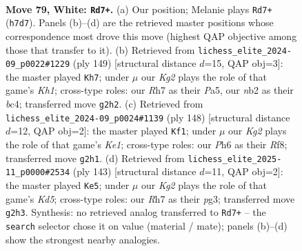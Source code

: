 \documentclass[11pt]{article}
\begin{document}
\clearpage

\begin{figure}[p]\centering
\begin{subfigure}{0.46\textwidth}\centering
\resizebox{\linewidth}{!}{%
\newchessgame
\chessboard[
  setfen={8/7R/6pP/3k1p2/5P2/8/pn4K1/8 w - - 0 79},
  showmover=false,
  pgfstyle=straightmove, color=movearrow, markmove={h7-d7}
]}
\caption{}
\end{subfigure}\hfill
\begin{subfigure}{0.46\textwidth}\centering
\resizebox{\linewidth}{!}{%
\newchessgame
\chessboard[
  setfen={7k/6p1/8/p4K1p/P1B4P/6P1/8/8 b - - 0 75},
  showmover=false,
  pgfstyle=straightmove, color=movearrow, markmove={h8-h7}
]}
\caption{}
\end{subfigure}
\\[4pt]
\begin{subfigure}{0.46\textwidth}\centering
\resizebox{\linewidth}{!}{%
\newchessgame
\chessboard[
  setfen={5R2/8/8/4p1k1/3p4/5P2/r7/4K3 w - - 16 75},
  showmover=false,
  pgfstyle=straightmove, color=movearrow, markmove={e1-f1}
]}
\caption{}
\end{subfigure}\hfill
\begin{subfigure}{0.46\textwidth}\centering
\resizebox{\linewidth}{!}{%
\newchessgame
\chessboard[
  setfen={8/8/8/8/pP1k2p1/P2p2P1/8/4K3 b - - 2 72},
  showmover=false,
  pgfstyle=straightmove, color=movearrow, markmove={d4-e5}
]}
\caption{}
\end{subfigure}
\caption{\textbf{Move 79, White: \texttt{Rd7+}.} (a) Our position; Melanie plays \texttt{Rd7+} (\texttt{h7d7}). Panels (b)--(d) are the retrieved master positions whose correspondence most drove this move (highest QAP objective among those that transfer to it). (b) Retrieved from \texttt{lichess\_elite\_2024-09\_p0022\#1229} (ply 149) [structural distance $d$=15, QAP obj=3]: the master played \texttt{Kh7}; under $\mu$ our \emph{Kg2} plays the role of that game's \emph{Kh1}; cross-type roles: our \emph{R}h7 as their \emph{P}a5, our \emph{n}b2 as their \emph{b}c4; transferred move \texttt{g2h2}. (c) Retrieved from \texttt{lichess\_elite\_2024-09\_p0024\#1139} (ply 148) [structural distance $d$=12, QAP obj=2]: the master played \texttt{Kf1}; under $\mu$ our \emph{Kg2} plays the role of that game's \emph{Ke1}; cross-type roles: our \emph{P}h6 as their \emph{R}f8; transferred move \texttt{g2h1}. (d) Retrieved from \texttt{lichess\_elite\_2025-11\_p0000\#2534} (ply 143) [structural distance $d$=11, QAP obj=2]: the master played \texttt{Ke5}; under $\mu$ our \emph{Kg2} plays the role of that game's \emph{Kd5}; cross-type roles: our \emph{R}h7 as their \emph{p}g3; transferred move \texttt{g2h3}. Synthesis: no retrieved analog transferred to \texttt{Rd7+} -- the \texttt{search} selector chose it on value (material / mate); panels (b)--(d) show the strongest nearby analogies.}
\label{fig:thought-m156}
\end{figure}
\end{document}
